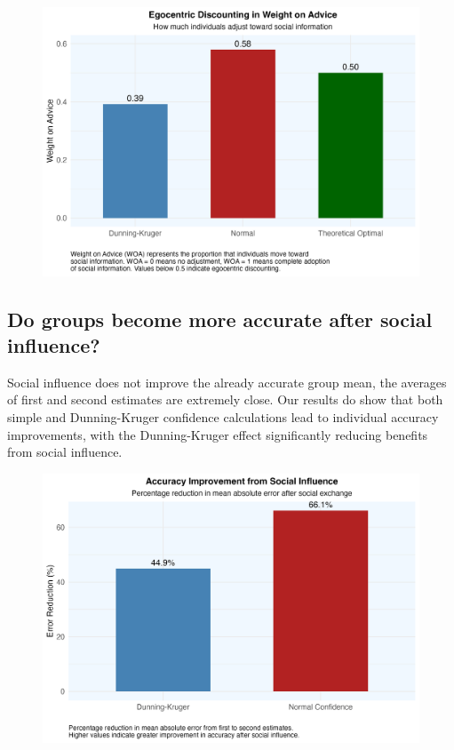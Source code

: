 \documentclass[
  man,floatsintext]{apa6}
\begin{document}
\begin{figure}[H]
\includegraphics[width=7in]{photos/weight_on_advice} \caption{ }\label{fig:unnamed-chunk-5}
\end{figure}

\hypertarget{do-groups-become-more-accurate-after-social-influence}{%
\subsection{Do groups become more accurate after social influence?}\label{do-groups-become-more-accurate-after-social-influence}}

Social influence does not improve the already accurate group mean, the averages of first and second estimates are extremely close. Our results do show that both simple and Dunning-Kruger confidence calculations lead to individual accuracy improvements, with the Dunning-Kruger effect significantly reducing benefits from social influence.

\begin{figure}[H]
\includegraphics[width=7in]{photos/accuracy_improvement} \caption{ }\label{fig:unnamed-chunk-6}
\end{figure}
\end{document}
